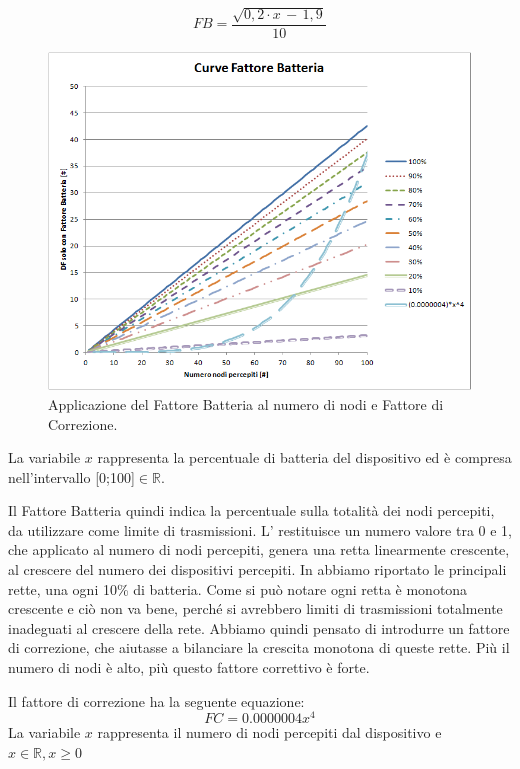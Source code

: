 \begin{equation}
	\label{eq:df_FB}
	FB = \dfrac{\sqrt{0,2\cdot x\,-\,1,9}}{10}
\end{equation}
\begin{figure}[tb]
	\centering
	\includegraphics[width=0.9\linewidth]{Images/grafici_usati/DF_curve_fattore_batteria_corr}
	\caption[DF curve fb con correzione]{Applicazione del Fattore Batteria al numero di nodi e Fattore di Correzione.}
	\label{fig:DF_curve_fattore_batteria_corr}
\end{figure}
La variabile $\textit{x}$ rappresenta la percentuale di batteria del dispositivo ed è compresa nell'intervallo [0;100]$\in\mathbb{R}$.

Il Fattore Batteria quindi indica la percentuale sulla totalità dei nodi percepiti, da utilizzare come limite di trasmissioni. L' restituisce un numero valore tra 0 e 1, che applicato al numero di nodi percepiti, genera una retta linearmente crescente, al crescere del numero dei dispositivi percepiti. In  abbiamo riportato le principali rette, una ogni 10\% di batteria. Come si può notare ogni retta è monotona crescente e ciò non va bene, perché si avrebbero limiti di trasmissioni totalmente inadeguati al crescere della rete. Abbiamo quindi pensato di introdurre un fattore di correzione, che aiutasse a bilanciare la crescita monotona di queste rette. Più il numero di nodi è alto, più questo fattore correttivo è forte.

Il fattore di correzione ha la seguente equazione:
\begin{equation}
	\label{eq:df_FC}
	FC = 0.0000004x^4
\end{equation}
La variabile $\textit{x}$ rappresenta il numero di nodi percepiti dal dispositivo e $ \textit{x}\in\mathbb{R},x\geq0$

